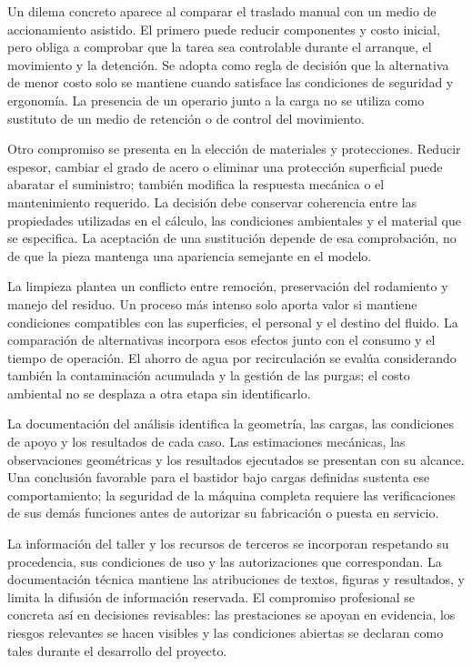 Un dilema concreto aparece al comparar el traslado manual con un medio de accionamiento asistido. El primero puede reducir componentes y costo inicial, pero obliga a comprobar que la tarea sea controlable durante el arranque, el movimiento y la detención. Se adopta como regla de decisión que la alternativa de menor costo solo se mantiene cuando satisface las condiciones de seguridad y ergonomía. La presencia de un operario junto a la carga no se utiliza como sustituto de un medio de retención o de control del movimiento.

Otro compromiso se presenta en la elección de materiales y protecciones. Reducir espesor, cambiar el grado de acero o eliminar una protección superficial puede abaratar el suministro; también modifica la respuesta mecánica o el mantenimiento requerido. La decisión debe conservar coherencia entre las propiedades utilizadas en el cálculo, las condiciones ambientales y el material que se especifica. La aceptación de una sustitución depende de esa comprobación, no de que la pieza mantenga una apariencia semejante en el modelo.

La limpieza plantea un conflicto entre remoción, preservación del rodamiento y manejo del residuo. Un proceso más intenso solo aporta valor si mantiene condiciones compatibles con las superficies, el personal y el destino del fluido. La comparación de alternativas incorpora esos efectos junto con el consumo y el tiempo de operación. El ahorro de agua por recirculación se evalúa considerando también la contaminación acumulada y la gestión de las purgas; el costo ambiental no se desplaza a otra etapa sin identificarlo.

La documentación del análisis identifica la geometría, las cargas, las condiciones de apoyo y los resultados de cada caso. Las estimaciones mecánicas, las observaciones geométricas y los resultados ejecutados se presentan con su alcance. Una conclusión favorable para el bastidor bajo cargas definidas sustenta ese comportamiento; la seguridad de la máquina completa requiere las verificaciones de sus demás funciones antes de autorizar su fabricación o puesta en servicio.

La información del taller y los recursos de terceros se incorporan respetando su procedencia, sus condiciones de uso y las autorizaciones que correspondan. La documentación técnica mantiene las atribuciones de textos, figuras y resultados, y limita la difusión de información reservada. El compromiso profesional se concreta así en decisiones revisables: las prestaciones se apoyan en evidencia, los riesgos relevantes se hacen visibles y las condiciones abiertas se declaran como tales durante el desarrollo del proyecto.
